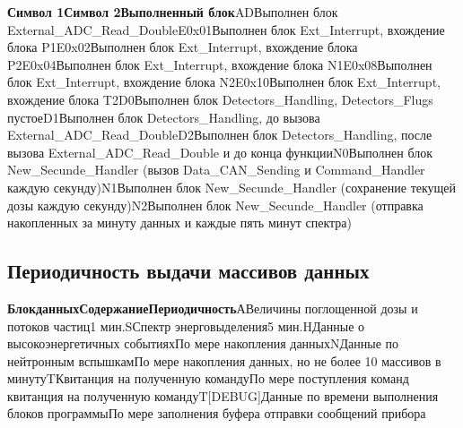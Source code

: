 \documentclass[a4paper,portrait,12pt]{article}
\begin{document}
{{{{\textbf{Символ 1Символ 2Выполненный блок}ADВыполнен блок External\_ADC\_Read\_DoubleE0x01Выполнен блок Ext\_Interrupt, вхождение блока P1E0x02Выполнен блок Ext\_Interrupt, вхождение блока P2E0x04Выполнен блок Ext\_Interrupt, вхождение блока N1E0x08Выполнен блок Ext\_Interrupt, вхождение блока N2E0x10Выполнен блок Ext\_Interrupt, вхождение блока T2D0Выполнен блок Detectors\_Handling, Detectors\_Flugs пустоеD1Выполнен блок Detectors\_Handling, до вызова External\_ADC\_Read\_DoubleD2Выполнен блок Detectors\_Handling, после вызова External\_ADC\_Read\_Double и до конца функцииN0Выполнен блок New\_Secunde\_Handler (вызов Data\_CAN\_Sending и Command\_Handler каждую секунду)N1Выполнен блок New\_Secunde\_Handler (сохранение текущей дозы каждую секунду)N2Выполнен блок New\_Secunde\_Handler (отправка накопленных за минуту данных и каждые пять минут спектра)





\newpage






\begin{flushleft}

\end{flushleft}


\subsection*{	\textbf{Периодичность выдачи массивов данных}}




\textbf{{\large Блок}}\textbf{{\large  }}\textbf{{\large данныхСодержаниеПериодичность}}{\small АВеличины поглощенной дозы и потоков частиц1 мин.}{\small S}{\small Спектр энерговыделения5 мин.}{\small H}{\small Данные о высокоэнергетичных событияхПо мере накопления данных}{\small N}{\small Данные по нейтронным вспышкамПо мере накопления данных, но не более 10 массивов в минуту}{\small T}{\small Квитанция на полученную командуПо мере поступления команд квитанция на полученную команду}{\small T[DEBUG]}{\small Данные по времени выполнения блоков программыПо мере заполнения буфера отправки сообщений прибора}





\begin{flushleft}

\end{flushleft}














}}}}
\end{document}
